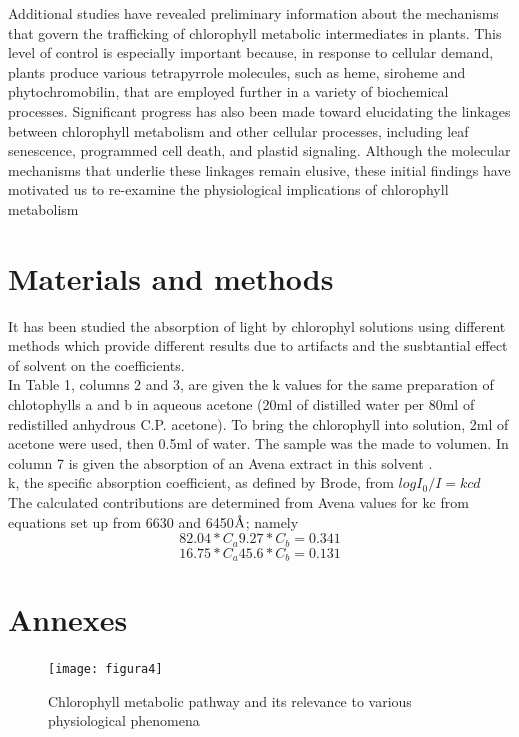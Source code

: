 \documentclass[a4paper, twocolumn, 11pt]{article}
\begin{document}
	Additional studies have revealed preliminary information about the mechanisms that govern the trafficking of chlorophyll metabolic intermediates in plants. This level of control is especially important because, in response to cellular demand, plants produce various tetrapyrrole molecules, such as heme, siroheme and phytochromobilin, that are employed further in a variety of biochemical processes. Significant progress has also been made toward elucidating the linkages between chlorophyll metabolism and other cellular processes, including leaf senescence, programmed cell death, and plastid signaling. Although the molecular mechanisms that underlie these linkages remain elusive, these initial findings have motivated us to re-examine the physiological implications of chlorophyll metabolism \cite{Tanaka2006}

\section{Materials and methods}
	It has been studied the absorption of light by chlorophyl solutions using different methods which provide different results due to artifacts and the susbtantial effect of solvent on the coefficients. \\
	
	In Table 1, columns 2 and 3, are given the k values for the same preparation of chlotophylls a and b in aqueous acetone (20ml of distilled water per 80ml of redistilled anhydrous C.P. acetone). To bring the chlorophyll into solution, 2ml of acetone were used, then 0.5ml of water. The sample was the made to volumen. In column 7 is given the absorption of an Avena extract in this solvent \cite{Mackinney}.\\
	
	k, the specific absorption coefficient, as defined by Brode\cite{Brodc1939}, from $logI_0/I=kcd$\\
	
	The calculated contributions are determined from Avena values for kc from equations set up from 6630 and 6450$\textup{\r{A}}$; namely
	\begin{equation}
	82.04*C_a9.27*C_b=0.341
	\end{equation}
	\begin{equation}
	16.75*C_a45.6*C_b=0.131
	\end{equation}
	\cite{Mackinney}
	




\onecolumn
\section{Annexes}
\begin{figure}[htb]
	\centering
	\texttt{[image: figura4]}
	\caption{Chlorophyll metabolic pathway and its relevance to various physiological phenomena \cite{Tanaka2006}} 
	\label{fig3}
\end{figure}
\end{document}

